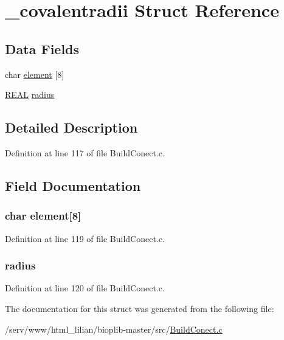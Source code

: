 \hypertarget{struct__covalentradii}{\section{\-\_\-covalentradii Struct Reference}
\label{struct__covalentradii}
}
\subsection*{Data Fields}
\begin{DoxyCompactItemize}
\item 
char \hyperlink{struct__covalentradii_a780be116469a48c4b1d531bafb335f99}{element} \mbox{[}8\mbox{]}
\item 
\hyperlink{_math_type_8h_a5821460e95a0800cf9f24c38915cbbde}{R\-E\-A\-L} \hyperlink{struct__covalentradii_adbb0a693780e69d9de0f58378fc1eb23}{radius}
\end{DoxyCompactItemize}


\subsection{Detailed Description}


Definition at line 117 of file Build\-Conect.\-c.



\subsection{Field Documentation}
\hypertarget{struct__covalentradii_a780be116469a48c4b1d531bafb335f99}{
\subsubsection[{element}]{\setlength{\rightskip}{0pt plus 5cm}char element\mbox{[}8\mbox{]}}}\label{struct__covalentradii_a780be116469a48c4b1d531bafb335f99}


Definition at line 119 of file Build\-Conect.\-c.

\hypertarget{struct__covalentradii_adbb0a693780e69d9de0f58378fc1eb23}{
\subsubsection[{radius}]{ radius}}\label{struct__covalentradii_adbb0a693780e69d9de0f58378fc1eb23}


Definition at line 120 of file Build\-Conect.\-c.



The documentation for this struct was generated from the following file\-:\begin{DoxyCompactItemize}
\item 
/serv/www/html\-\_\-lilian/bioplib-\/master/src/\hyperlink{_build_conect_8c}{Build\-Conect.\-c}\end{DoxyCompactItemize}

